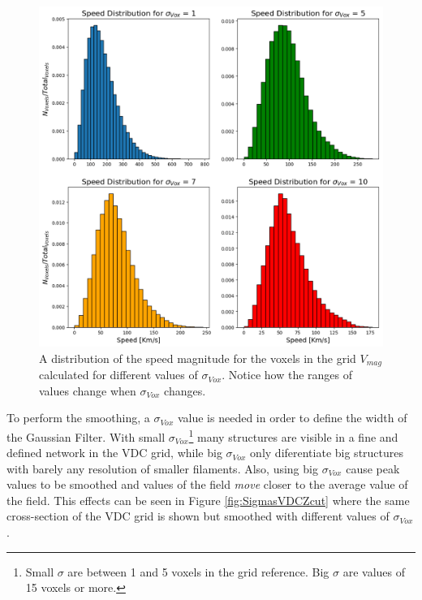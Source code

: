 \begin{figure}[!h]
    \centering
    \includegraphics[width=400pt]{VMD_varios.png}
    \caption{A distribution of the speed magnitude for the voxels in the grid $V_{mag}$ calculated for different values of $\sigma_{Vox}$. Notice how the ranges of values change when $\sigma_{Vox}$ changes.}
    \label{fig:MD_Varios}
\end{figure}

To perform the smoothing, a $\sigma_{Vox}$ value is needed in order to define the width of the Gaussian Filter. With small $\sigma_{Vox}$\footnote{Small $\sigma$ are between 1 and 5 voxels in the grid reference. Big $\sigma$ are values of 15 voxels or more.} many structures are visible in a fine and defined network in the VDC grid, while big $\sigma_{Vox}$ only diferentiate big structures with barely any resolution of smaller filaments. Also, using big $\sigma_{Vox}$ cause peak values to be smoothed and values of the field \textit{move }closer to  the average value of the field. This effects can be seen in Figure \ref{fig:SigmasVDCZcut} where the same cross-section of the VDC grid is shown but smoothed with different values of $\sigma_{Vox}$.


